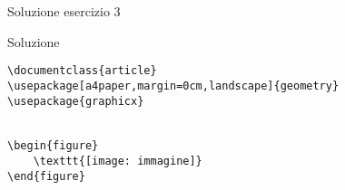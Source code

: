 \begin{frame}[fragile]{Soluzione esercizio 3}

\begin{block}{Soluzione}
\begin{lstlisting}
\documentclass{article}
\usepackage[a4paper,margin=0cm,landscape]{geometry}
\usepackage{graphicx}


\begin{figure}
	\texttt{[image: immagine]}
\end{figure}


\end{lstlisting}
\end{block}

\end{frame}
